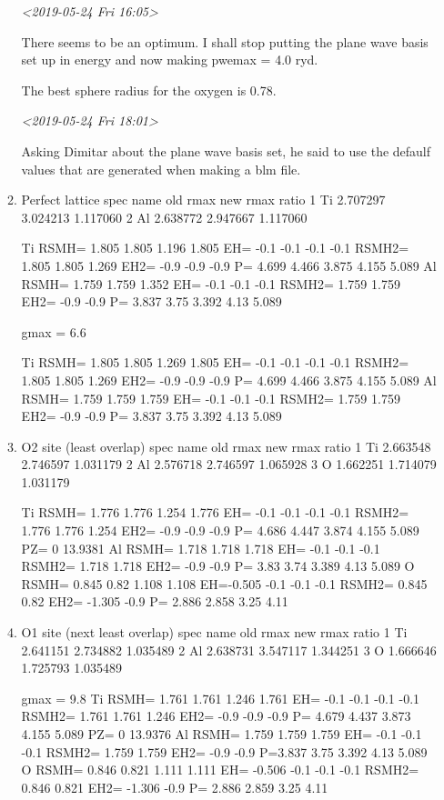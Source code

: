 \documentclass[11pt]{article}
\begin{document}
\begin{enumerate}
\begin{enumerate}
\textit{<2019-05-24 Fri 16:05>}

There seems to be an optimum. I shall stop putting the plane wave basis set up
in energy and now making pwemax = 4.0 ryd. 

The best sphere radius for the oxygen is 0.78.


\textit{<2019-05-24 Fri 18:01>}

Asking Dimitar about the plane wave basis set, he said to use the defaulf
values that are generated when making a blm file. 



\item Perfect lattice
\label{sec:org07f01ee}
spec name old rmax new rmax ratio 
1 Ti 2.707297 3.024213 1.117060 
2 Al 2.638772 2.947667 1.117060

Ti RSMH= 1.805 1.805 1.196 1.805 EH= -0.1 -0.1 -0.1 -0.1 
   RSMH2= 1.805 1.805 1.269 EH2= -0.9 -0.9 -0.9 P= 4.699 4.466 3.875 4.155 5.089 
Al RSMH= 1.759 1.759 1.352 EH= -0.1 -0.1 -0.1 
   RSMH2= 1.759 1.759 EH2= -0.9 -0.9 P= 3.837 3.75 3.392 4.13 5.089

gmax = 6.6

Ti RSMH= 1.805 1.805 1.269 1.805 EH= -0.1 -0.1 -0.1 -0.1 
   RSMH2= 1.805 1.805 1.269 EH2= -0.9 -0.9 -0.9 P= 4.699 4.466 3.875 4.155 5.089 
Al RSMH= 1.759 1.759 1.759 EH= -0.1 -0.1 -0.1 RSMH2= 1.759 1.759 EH2= -0.9 -0.9 P= 3.837 3.75 3.392 4.13 5.089

\item O2 site (least overlap)
\label{sec:orga8b1076}
spec name old rmax new rmax ratio 
1 Ti 2.663548 2.746597 1.031179 
2 Al 2.576718 2.746597 1.065928 
3 O 1.662251 1.714079 1.031179

Ti RSMH= 1.776 1.776 1.254 1.776 EH= -0.1 -0.1 -0.1 -0.1 RSMH2= 1.776 1.776 1.254 
   EH2= -0.9 -0.9 -0.9 P= 4.686 4.447 3.874 4.155 5.089 PZ= 0 13.9381 
Al RSMH= 1.718 1.718 1.718 EH= -0.1 -0.1 -0.1
   RSMH2= 1.718 1.718 EH2= -0.9 -0.9 P= 3.83 3.74 3.389 4.13 5.089 
O RSMH= 0.845 0.82 1.108 1.108 EH=-0.505 -0.1 -0.1 -0.1 RSMH2= 0.845 0.82 
   EH2= -1.305 -0.9 P= 2.886 2.858 3.25 4.11

\item O1 site (next least overlap)
\label{sec:org26e09b7}
spec name old rmax new rmax ratio 
1 Ti 2.641151 2.734882 1.035489 
2 Al 2.638731 3.547117 1.344251 
3 O 1.666646 1.725793 1.035489

gmax = 9.8
Ti RSMH= 1.761 1.761 1.246 1.761 EH= -0.1 -0.1 -0.1 -0.1 
   RSMH2= 1.761 1.761 1.246 EH2= -0.9 -0.9 -0.9 P= 4.679 4.437 3.873 4.155 5.089
   PZ= 0 13.9376 
Al RSMH= 1.759 1.759 1.759 EH= -0.1 -0.1 -0.1 
   RSMH2= 1.759 1.759 EH2= -0.9 -0.9 P=3.837 3.75 3.392 4.13 5.089 
O RSMH= 0.846 0.821 1.111 1.111 EH= -0.506 -0.1 -0.1 -0.1 RSMH2= 0.846 0.821
EH2= -1.306 -0.9 P= 2.886 2.859 3.25 4.11


\end{enumerate}
\end{enumerate}
\end{document}
